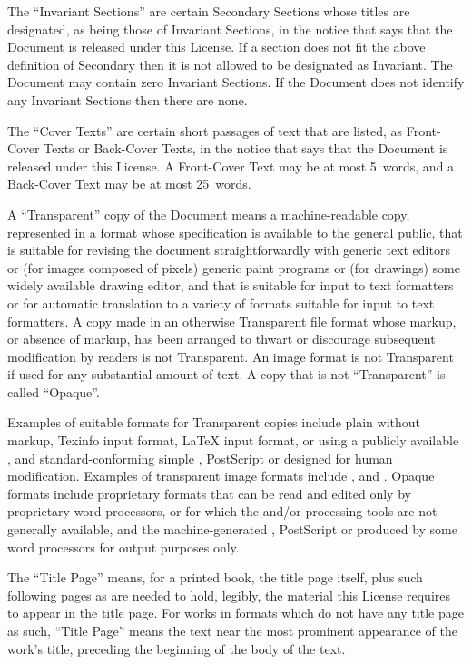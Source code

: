 \begin{enumerate}
  The ``Invariant Sections'' are certain Secondary Sections whose titles are designated, as
  being those of Invariant Sections, in the notice that says that the Document is released under
  this License.  If a section does not fit the above definition of Secondary then it is not
  allowed to be designated as Invariant.  The Document may contain zero Invariant Sections.  If
  the Document does not identify any Invariant Sections then there are none.

  The ``Cover Texts'' are certain short passages of text that are listed, as Front-Cover Texts
  or Back-Cover Texts, in the notice that says that the Document is released under this License.
  A Front-Cover Text may be at most 5~words, and a Back-Cover Text may be at most 25~words.

  A ``Transparent'' copy of the Document means a machine-readable copy, represented in a format
  whose specification is available to the general public, that is suitable for revising the
  document straightforwardly with generic text editors or (for images composed of pixels)
  generic paint programs or (for drawings) some widely available drawing editor, and that is
  suitable for input to text formatters or for automatic translation to a variety of formats
  suitable for input to text formatters.  A copy made in an otherwise Transparent file format
  whose markup, or absence of markup, has been arranged to thwart or discourage subsequent
  modification by readers is not Transparent.  An image format is not Transparent if used for
  any substantial amount of text.  A copy that is not ``Transparent'' is called ``Opaque''.

  Examples of suitable formats for Transparent copies include plain  without
  markup, Texinfo input format, \LaTeX{} input format,  or  using a
  publicly available , and standard-conforming simple , PostScript or
   designed for human modification.  Examples of transparent image formats include
  ,  and .  Opaque formats include proprietary formats
  that can be read and edited only by proprietary word processors,  or
   for which the  and/or processing tools are not generally available,
  and the machine-generated , PostScript or  produced by some word
  processors for output purposes only.

  The ``Title Page'' means, for a printed book, the title page itself, plus such following pages
  as are needed to hold, legibly, the material this License requires to appear in the title
  page.  For works in formats which do not have any title page as such, ``Title Page'' means the
  text near the most prominent appearance of the work's title, preceding the beginning of the
  body of the text.


\end{enumerate}
